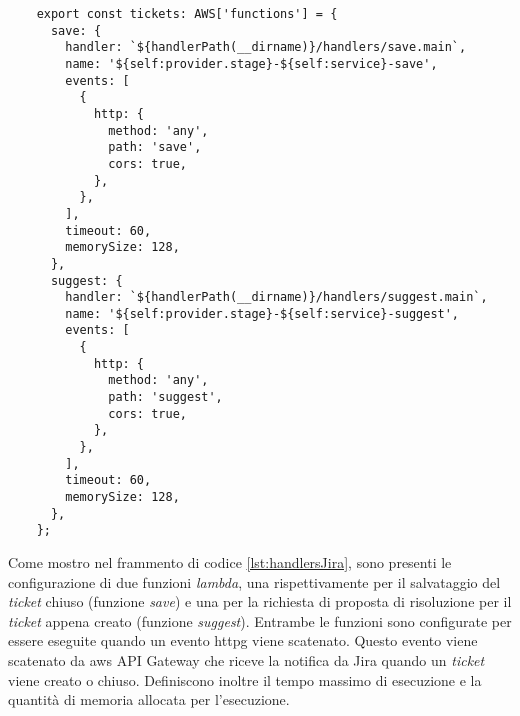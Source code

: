 \begin{verbatim}
    export const tickets: AWS['functions'] = {
      save: {
        handler: `${handlerPath(__dirname)}/handlers/save.main`,
        name: '${self:provider.stage}-${self:service}-save',
        events: [
          {
            http: {
              method: 'any',
              path: 'save',
              cors: true,
            },
          },
        ],
        timeout: 60,
        memorySize: 128,
      },
      suggest: {
        handler: `${handlerPath(__dirname)}/handlers/suggest.main`,
        name: '${self:provider.stage}-${self:service}-suggest',
        events: [
          {
            http: {
              method: 'any',
              path: 'suggest',
              cors: true,
            },
          },
        ],
        timeout: 60,
        memorySize: 128,
      },
    };
\end{verbatim}
\vspace{-0.5cm}
\label{lst:handlersJira}
\vspace{0.3cm}
Come mostro nel frammento di codice \ref{lst:handlersJira}, sono presenti le configurazione di due funzioni \textit{lambda}, una rispettivamente per il salvataggio del \textit{ticket} chiuso (funzione \textit{save}) e una per la richiesta di proposta di risoluzione per il \textit{ticket} appena creato (funzione \textit{suggest}).  Entrambe le funzioni sono configurate per essere eseguite quando un evento \gls{httpg} viene scatenato. Questo evento viene scatenato da \gls{aws} API Gateway che riceve la notifica da Jira quando un \textit{ticket} viene creato o chiuso.
Definiscono inoltre il tempo massimo di esecuzione e la quantità di memoria allocata per l'esecuzione.

